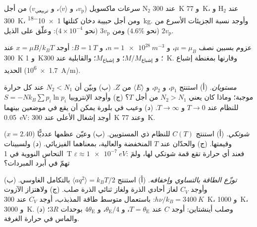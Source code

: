 \begin{exercise}[$\star$]\label{exo:b2:boltzmann-factor:3}
سرعات ماكسويل ($v_{\text{p}}$، و $\langle v\rangle$، و $v_{\text{تربيعي}}$) من أجل N$_2$
عند \qty{300}{K} و \qty{77}{K}، و H$_2$ عند \qty{300}{K}، ومن أجل حبيبة دخان
كتلتها \qty{1e-18}{kg}. وأوجد نسبة الجزيئات الأسرع من $2v_{\text{p}}$
(نحو $4.6\%$) ومن $3v_{\text{p}}$ (نحو $4 \times 10^{-4}$): وعلّق على
الذيل.
\end{exercise}

\begin{exercise}[$\star$]\label{exo:b2:boltzmann-factor:4}
عزوم بسبين نصف $\mu = \mu_B$، و $n = \qty{1e28}{m^{-3}}$، و $B = \qty{1}{T}$:
أوجد $x = \mu B/k_BT$ عند \qty{300}{K} و \qty{1}{K}؛ و $M/M_{\text{إشباع}}$؛ و $M_{\text{إشباع}}$؛
والقابلية عند \qty{300}{K}. وقارنها بمغنطة إشباع الحديد
(\qty{1.7e6}{A/m}).
\end{exercise}

\begin{exercise}[$\star\star$]\label{exo:b2:boltzmann-factor:5}
\emph{مستويان.} (أ) استنتج $p_1$، و $p_2$، و $\langle E\rangle$ من $Z$. (ب)
وبيّن أن $N_2 < N_1$ عند كل حرارة موجبة؛ وماذا كان يعني $N_2 >
N_1$ من أجل $T$؟ (ج) وأوجد الإنتروبيا $S = -Nk_B\sum p_i\ln p_i$ للنظام عند
$T \to 0$ و $T \to \infty$. (د) وعيب في بلورة يمكن أن يقع في موضعين
بينهما \qty{0.05}{eV}: أوجد إشغال الأعلى عند
\qty{300}{K} وعند \qty{77}{K}.
\end{exercise}

\begin{exercise}[$\star\star$]\label{exo:b2:boltzmann-factor:6}
\emph{شوتكي.} (أ) استنتج $C(T)$ للنظام ذي المستويين. (ب) وعيّن
عظمها عدديًّا ($x = 2.40$) وقيمتها. (ج) والحدّان عند $T$ المنخفضة
والعالية، بمعناهما الفيزيائي. (د) ولسبينات النحاس النووية
في \qty{1}{T} $\varepsilon \approx \qty{1e-7}{eV}$: فعند أي حرارة تقع
قمة شوتكي لها، ولمَ تهمّ في أبرد المبردات؟
\end{exercise}

\begin{exercise}[$\star\star$]\label{exo:b2:boltzmann-factor:7}
\emph{توزّع الطاقة بالتساوي وإخفاقه.} (أ) استنتج $\langle aq^2\rangle =
k_BT/2$ بالتكامل الغاوسي. (ب) وأوجد $C_V$ لغاز أحادي الذرة ولغاز
ثنائي الذرة صلب. (ج) ولاهتزاز الآزوت $h\nu/k_B = \qty{3400}{K}$:
باستعمال متوسط طاقة المذبذب، أوجد $C_V$ عند \qty{300}{K}، و \qty{1000}{K}،
و \qty{3000}{K}. (د) وصلب أينشتاين: أوجد $C$ عند $T = \theta_{\text{E}}$، و $\theta_{\text{E}}/4$،
و $4\theta_{\text{E}}$ بوحدات $3R$؛ والماس في حرارة الغرفة.
\end{exercise}

